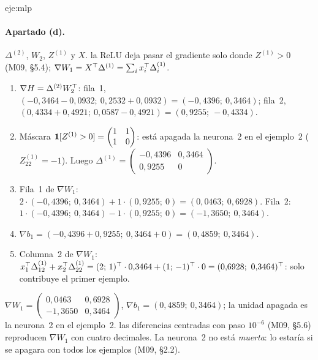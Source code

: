 \begin{solucion}{eje:mlp}
\paragraph{Apartado (d).}
\datos $\Delta^{(2)}$, $W_2$, $Z^{(1)}$ y $X$.
\planteamiento la ReLU deja pasar el gradiente solo donde $Z^{(1)}>0$ (M09, §5.4); $\nabla W_1=X^{\top}\Delta^{(1)}=\sum_i x_i^{\top}\Delta^{(1)}_i$.
\pasos
\begin{enumerate}[label=\arabic*.]
  \item $\nabla H=\Delta^{(2)}W_2^{\top}$: fila~1, $(-0{,}3464-0{,}0932;\allowbreak\ 0{,}2532+0{,}0932)=(-0{,}4396;\allowbreak\ 0{,}3464)$; fila~2, $(0{,}4334+0{,}4921;\allowbreak\ 0{,}0587-0{,}4921)=(0{,}9255;\allowbreak\ -0{,}4334)$.
  \item Máscara $\mathbf{1}[Z^{(1)}>0]=\begin{pmatrix}1&1\\1&0\end{pmatrix}$: está apagada la neurona~2 en el ejemplo~2 ($Z^{(1)}_{22}=-1$). Luego $\Delta^{(1)}=\begin{pmatrix}-0{,}4396&0{,}3464\\0{,}9255&0\end{pmatrix}$.
  \item Fila~1 de $\nabla W_1$: $2\cdot(-0{,}4396;\allowbreak\ 0{,}3464)+1\cdot(0{,}9255;\allowbreak\ 0)=(0{,}0463;\allowbreak\ 0{,}6928)$. Fila~2: $1\cdot(-0{,}4396;\allowbreak\ 0{,}3464)-1\cdot(0{,}9255;\allowbreak\ 0)=(-1{,}3650;\allowbreak\ 0{,}3464)$.
  \item $\nabla b_1=(-0{,}4396+0{,}9255;\allowbreak\ 0{,}3464+0)=(0{,}4859;\allowbreak\ 0{,}3464)$.
  \item Columna~2 de $\nabla W_1$: $x_1^{\top}\Delta^{(1)}_{12}+x_2^{\top}\Delta^{(1)}_{22}=(2;\,1)^{\top}\cdot 0{,}3464+(1;\,-1)^{\top}\cdot 0=(0{,}6928;\allowbreak\ 0{,}3464)^{\top}$: solo contribuye el primer ejemplo.
\end{enumerate}
\resultado $\nabla W_1=\begin{pmatrix}0{,}0463&0{,}6928\\-1{,}3650&0{,}3464\end{pmatrix}$, $\nabla b_1=(0{,}4859;\allowbreak\ 0{,}3464)$; la unidad apagada es la neurona~2 en el ejemplo~2.
\comprobacion las diferencias centradas con paso $10^{-6}$ (M09, §5.6) reproducen $\nabla W_1$ con cuatro decimales. La neurona~2 no está \emph{muerta}: lo estaría si se apagara con todos los ejemplos (M09, §2.2).


\end{solucion}
